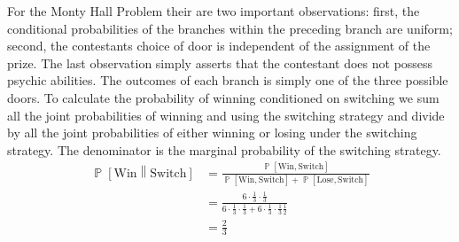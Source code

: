 \documentclass[answers]{exam}
\begin{document}
\begin{questions}
\begin{solution}
            For the Monty Hall Problem their are two important observations: first, the
            conditional probabilities of the branches within the preceding branch are
            uniform; second, the contestants choice of door is independent of the assignment
            of the prize. The last observation simply asserts that the contestant does not
            possess psychic abilities. The outcomes of each branch is simply one of the
            three possible doors. To calculate the probability of winning conditioned on
            switching we sum all the joint probabilities of winning and using the switching
            strategy and divide by all the joint probabilities of either winning or losing
            under the switching strategy. The denominator is the marginal probability of the
            switching strategy.
            \begin{align*}
                \operatorname{\mathbb{P}}\left[ \text{Win} \middle\| \text{Switch} \right]
                & =
                \frac{\operatorname{\mathbb{P}}\left[ \text{Win},  \text{Switch} \right]}
                {\operatorname{\mathbb{P}}\left[ \text{Win},  \text{Switch} \right] + \operatorname{\mathbb{P}}\left[ \text{Lose},  \text{Switch} \right]}
                \\ & =
                \frac{6 \cdot \frac{1}{3} \cdot \frac{1}{3}}
                {6 \cdot \frac{1}{3} \cdot \frac{1}{3} + 6 \cdot \frac{1}{3} \cdot \frac{1}{3} \frac{1}{2}}
                \\ & =
                \frac{2}{3}
            \end{align*}
            \begin{center}
\end{center}
\end{solution}
\end{questions}
\end{document}
